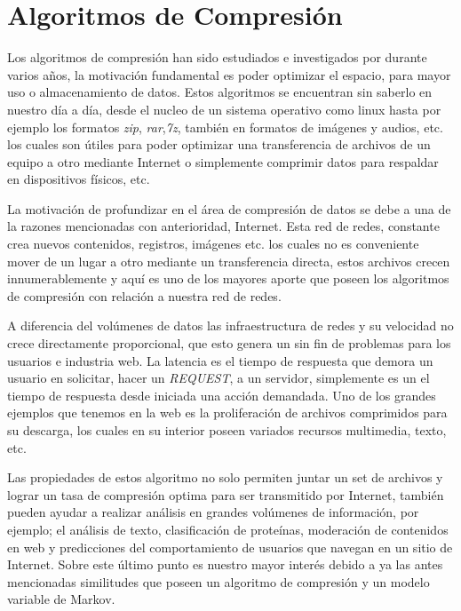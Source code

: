 \chapter[Algoritmos de Compresión]{Algoritmos de Compresión}
\label{ch:tema}


Los algoritmos de compresión han sido estudiados e investigados por durante varios años, la motivación
fundamental es poder optimizar el espacio, para mayor uso o almacenamiento de datos. Estos algoritmos se encuentran sin saberlo en nuestro día a día, desde el nucleo de un sistema operativo como linux hasta por ejemplo los formatos \emph{zip}, \emph{rar},\emph{7z}, también en formatos de imágenes y audios, etc. los cuales son útiles para poder optimizar una transferencia de archivos de un equipo a otro mediante Internet o simplemente comprimir datos para respaldar en dispositivos físicos, etc.

La motivación de profundizar en el área de compresión de datos se debe a una de la razones mencionadas con anterioridad, Internet. Esta red de redes, constante crea nuevos contenidos, registros, imágenes etc. los cuales no es conveniente mover de un lugar a otro mediante un transferencia directa, estos archivos crecen innumerablemente y aquí es uno de los mayores aporte que poseen los algoritmos de compresión con relación a nuestra red de redes. 

A diferencia del volúmenes de datos las infraestructura de redes y su velocidad no crece directamente proporcional, que esto genera un sin fin de problemas para los usuarios e industria web. La latencia  es el tiempo de respuesta que demora un usuario en solicitar, hacer un \emph{REQUEST}, a un servidor, simplemente es un el tiempo de respuesta desde iniciada una acción demandada. 
Uno de los grandes ejemplos que tenemos en la web es la proliferación de archivos comprimidos para su descarga, los cuales en su interior poseen variados recursos multimedia, texto, etc.

Las propiedades de estos algoritmo no solo permiten juntar un set de archivos y lograr un tasa de compresión optima para ser transmitido por Internet, también pueden ayudar a realizar análisis en grandes volúmenes de información, por ejemplo; el análisis de texto, clasificación de proteínas, moderación de contenidos en web y predicciones del comportamiento de usuarios que navegan en un sitio de Internet. Sobre este último punto es nuestro mayor interés debido a ya las antes mencionadas similitudes que poseen un algoritmo de compresión y un modelo variable de Markov.

